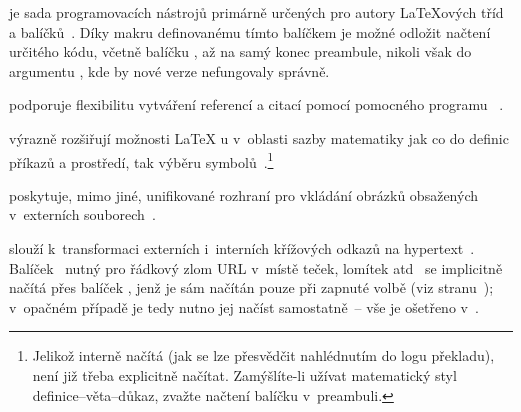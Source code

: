 \begin{description}
  \label{pkgetoolbox} je sada programovacích nástrojů
  primárně určených pro autory \LaTeX ových tříd a
  balíčků~\cite{Wri-Leh:LIVE:CTAN:etoolbox}. Díky makru  definovanému tímto balíčkem je možné odložit načtení
  určitého kódu, včetně balíčku , až na samý konec preambule,
  nikoli však do argumentu , kde by nové
  verze  nefungovaly správně.
  
\label{pkgnatbib} podporuje flexibilitu vytváření referencí
  a citací pomocí pomocného programu \BibTeX{}~\cite{Dal:LIVE:CTAN:natbib,%
    Dal:LIVE::Natbib,%
    Kop-Dal:2004:LaTeXPodrPruv:,%
    Goo-Mit-Sam:1994:Companion:}.

\label{pkgams} výrazně rozšiřují možnosti \LaTeX
  u v~oblasti sazby matematiky jak co do
  definic příkazů a prostředí, tak výběru
  symbolů~\cite{LtX:LIVE:CTAN:AMSmath,%
    AMS:LIVE:CTAN:AMSfonts,%
    Kop-Dal:2004:LaTeXPodrPruv:,%
    Goo-Mit-Sam:1994:Companion:}.\footnote{Jelikož  interně
    načítá  (jak se lze přesvědčit nahlédnutím do logu
    překladu), není již třeba  explicitně načítat. Zamýšlíte-li
    užívat matematický styl definice--věta--důkaz, zvažte načtení balíčku
     v~preambuli.}

\label{pkggraphicx} poskytuje, mimo jiné, unifikované
  rozhraní pro vkládání obrázků obsažených v~externích
  souborech~\cite{Car:LIVE:CTAN:Graphics,%
    Kop-Dal:2004:LaTeXPodrPruv:,%
    Goo-Rah-Mit:1994:GraComp:}.

\label{pkghyperref} slouží k~transformaci externích
  i~interních křížových odkazů na
  hypertext~\cite{LtX:LIVE:CTAN:hyperref}. Balíček~ nutný pro řádkový
  zlom URL v~místě teček, lomítek
  atd~\cite{Ars:LIVE:CTAN:url,Goo-Mit-Sam:1994:Companion:} se implicitně načítá
  přes balíček , jenž je sám načítán pouze při zapnuté volbě
   (viz stranu~\pageref{opthtext}); v~opačném případě je tedy nutno
  jej načíst samostatně~-- vše je ošetřeno v~.
\end{description}


